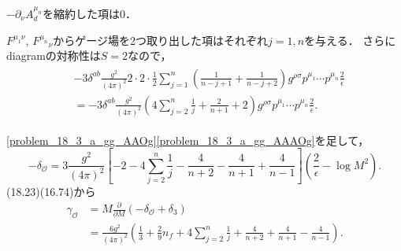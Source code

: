 $- \partial_\nu A^{\mu_n}_d$を縮約した項は$0$．

$F^{\mu_1\nu}$, $F^{\mu_n}{}_\nu$からゲージ場を2つ取り出した項はそれぞれ$j=1, n$を与える．
さらにdiagramの対称性は$S=2$なので，
\begin{align}
  \begin{split}
    &- 3 \delta^{ab} \frac{g^2}{(4\pi)^2} 2 \cdot 2 \cdot \frac{1}{2} \sum_{j=1}^n \left( \frac{1}{n-j+1} + \frac{1}{n-j+2} \right) g^{\rho\sigma} p^{\mu_1} \cdots p^{\mu_n} \frac{2}{\epsilon} \\
    &= - 3 \delta^{ab} \frac{g^2}{(4\pi)^2} \left( 4\sum_{j=2}^{n} \frac{1}{j} + \frac{2}{n+1} + 2 \right) g^{\rho\sigma} p^{\mu_1} \cdots p^{\mu_n} \frac{2}{\epsilon} .
  \end{split}
  \label{problem_18_3_a_gg_AAAOg}
\end{align}

\eqref{problem_18_3_a_gg_AAOg}\eqref{problem_18_3_a_gg_AAAOg}を足して，
\[
- \delta_\mathcal{O} =
3 \frac{g^2}{(4\pi)^2} \left[ -2 - 4\sum_{j=2}^{n} \frac{1}{j} - \frac{4}{n+2} - \frac{4}{n+1} + \frac{4}{n-1} \right]
\left(\frac{2}{\epsilon} - \log M^2\right) .
\]
(18.23)(16.74)から
\begin{align*}
  \gamma_\mathcal{O} &= M\frac{\partial}{\partial M} (-\delta_\mathcal{O}+\delta_3) \\
  &= \frac{6g^2}{(4\pi)^2} \left(\frac{1}{3} + \frac{2}{9}n_f + 4\sum_{j=2}^n \frac{1}{j} + \frac{4}{n+2} + \frac{4}{n+1} - \frac{4}{n-1}\right) .
\end{align*}
